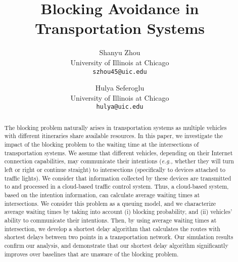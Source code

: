 \documentclass[conference]{IEEEtran}
\newcommand{\eg}{{\em e.g., }}
\begin{document}
\title{Blocking Avoidance in Transportation Systems}

\author{Shanyu Zhou\\
{\small University of Illinois at Chicago}\\
{ \small \tt szhou45@uic.edu}\\
\and
Hulya Seferoglu\\
{\small University of Illinois at Chicago}\\
{ \small \tt hulya@uic.edu}\\
}

\maketitle

\IEEEpeerreviewmaketitle


{}\vspace{-30pt}{}

\allowdisplaybreaks

\begin{abstract}

The blocking problem naturally arises in transportation systems as multiple vehicles with different itineraries share available resources. In this paper, we investigate the impact of the blocking problem to the waiting time at the intersections of transportation systems. We assume that different vehicles, depending on their Internet connection capabilities, may communicate their intentions (\eg whether they will turn left or right or continue straight) to intersections (specifically to devices attached to traffic lights). We consider that information collected by these devices are transmitted to and processed in a cloud-based traffic control system. Thus, a cloud-based system, based on the intention information, can calculate average waiting times at intersections. We consider this problem as a queuing model, and we characterize average waiting times by taking into account (i) blocking probability, and (ii) vehicles' ability to communicate their intentions. Then, by using average waiting times at intersection, we develop a shortest delay algorithm that calculates the routes with shortest delays between two points in a transportation network. Our simulation results confirm our analysis, and demonstrate that our shortest delay algorithm significantly improves over baselines that are unaware of the blocking problem.
\end{abstract} 

\vspace{-15pt}
\end{document}
